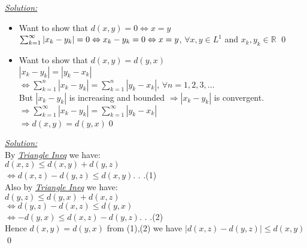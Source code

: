 \documentclass[12pt]{article}
\begin{document}
\begin{center} 
\end{center}
\textit{\color{red}\underline{Solution:}}
\begin{itemize}
    \item Want to show that $d(x,y)=0\Leftrightarrow x=y$\\
    $\sum_{k=1}^{\infty}|x_k-y_k|=0\\ \Leftrightarrow x_k-y_k=0\\ \Leftrightarrow x=y$, $\forall x,y \in L^1$ and $ x_k,y_k \in \mathbb{R}$ \qed
    \item Want to show that $d(x,y)=d(y,x)$\\
    $|x_k-y_k|=|y_k-x_k|$\\
    $\Leftrightarrow \sum_{k=1}^{n}|x_k-y_k|=\sum_{k=1}^{n}|y_k-x_k|$, $\forall n=1,2,3,...$\\
    But $|x_k-y_k|$ is increasing and bounded $\Rightarrow |x_k-y_k|$ is convergent. \\
    $\Rightarrow \sum_{k=1}^{\infty}|x_k-y_k|=\sum_{k=1}^{\infty}|y_k-x_k|$\\
    $\Rightarrow d(x,y)=d(y,x)$\qed
\end{itemize}
\newpage






\begin{center} 
\end{center}
\textit{\underline{\color{red}Solution:}}\\
By \textit{\underline{Triangle Ineq}} we have:\\
$d(x,z)\leq d(x,y)+d(y,z)$\\
$\Leftrightarrow d(x,z)-d(y,z) \leq d(x,y) $. . .(1)\\
Also by \textit{\underline{Triangle Ineq}} we have:\\
$d(y,z)\leq d(y,x)+d(x,z)$\\
$\Leftrightarrow d(y,z)-d(x,z)\leq d(y,x) $\\
$\Leftrightarrow -d(y,x)\leq d(x,z)-d(y,z)$. . .(2)\\
Hence $d(x,y)=d(y,x)$ from (1),(2) we have $|d(x,z)-d(y,z)|\leq d(x,y)$\qed
\newpage
\end{document}
